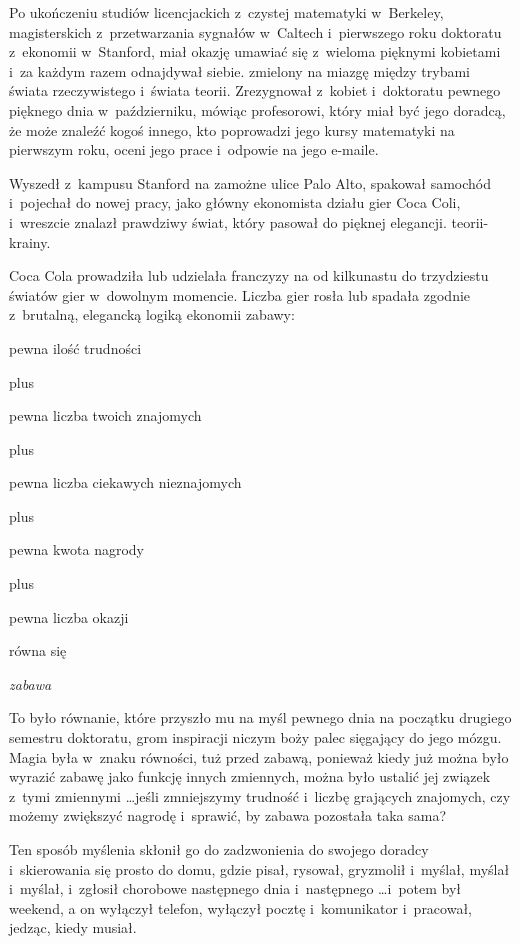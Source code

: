 \documentclass[oneside,polish,11pt,rmheadings]{mwbk}
\begin{document}
Po ukończeniu studiów licencjackich z~czystej matematyki w~Berkeley, magisterskich z~przetwarzania sygnałów w~Caltech i~pierwszego roku doktoratu z~ekonomii w~Stanford, miał okazję umawiać się z~wieloma pięknymi kobietami i~za każdym razem odnajdywał siebie. zmielony na miazgę między trybami świata rzeczywistego i~świata teorii. Zrezygnował z~kobiet i~doktoratu pewnego pięknego dnia w~październiku, mówiąc profesorowi, który miał być jego doradcą, że może znaleźć kogoś innego, kto poprowadzi jego kursy matematyki na pierwszym roku, oceni jego prace i~odpowie na jego e-maile. 


Wyszedł z~kampusu Stanford na zamożne ulice Palo Alto, spakował samochód i~pojechał do nowej pracy, jako główny ekonomista działu gier Coca Coli, i~wreszcie znalazł prawdziwy świat, który pasował do pięknej elegancji. teorii-krainy. 


Coca Cola prowadziła lub udzielała franczyzy na od kilkunastu do trzydziestu światów gier w~dowolnym momencie. Liczba gier rosła lub spadała zgodnie z~brutalną, elegancką logiką ekonomii zabawy: 

\begin{center}

pewna ilość trudności 


plus  


pewna liczba twoich znajomych 


plus  


pewna liczba ciekawych nieznajomych 


plus  


pewna kwota nagrody 


plus  


pewna liczba okazji 


równa się 


\textit{zabawa }

\end{center}




To było równanie, które przyszło mu na myśl pewnego dnia na początku drugiego semestru doktoratu, grom inspiracji niczym boży palec sięgający do jego mózgu. Magia była w~znaku równości, tuż przed zabawą, ponieważ kiedy już można było wyrazić zabawę jako funkcję innych zmiennych, można było ustalić jej związek z~tymi zmiennymi  \ldots  jeśli zmniejszymy trudność i~liczbę grających znajomych, czy możemy zwiększyć nagrodę i~sprawić, by zabawa pozostała taka sama?

Ten sposób myślenia skłonił go do zadzwonienia do swojego doradcy i~skierowania się prosto do domu, gdzie pisał, rysował, gryzmolił i~myślał, myślał i~myślał, i~zgłosił chorobowe następnego dnia i~następnego \ldots  i~potem był weekend, a on wyłączył telefon, wyłączył pocztę i~komunikator i~pracował, jedząc, kiedy musiał.
\end{document}
